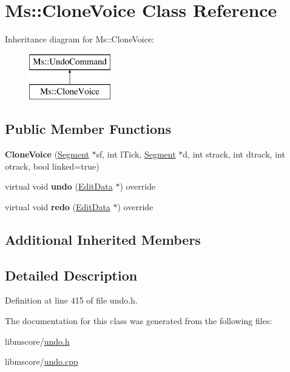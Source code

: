 \hypertarget{class_ms_1_1_clone_voice}{}\section{Ms\+:\+:Clone\+Voice Class Reference}
\label{class_ms_1_1_clone_voice}
Inheritance diagram for Ms\+:\+:Clone\+Voice\+:\begin{figure}[H]
\begin{center}
\leavevmode
\includegraphics[height=2.000000cm]{class_ms_1_1_clone_voice}
\end{center}
\end{figure}
\subsection*{Public Member Functions}
\begin{DoxyCompactItemize}
\item 
\mbox{\label{class_ms_1_1_clone_voice_aeb74663661780ec4a9a17130eada245b}} 
{\bfseries Clone\+Voice} (\hyperlink{class_ms_1_1_segment}{Segment} $\ast$sf, int l\+Tick, \hyperlink{class_ms_1_1_segment}{Segment} $\ast$d, int strack, int dtrack, int otrack, bool linked=true)
\item 
\mbox{\label{class_ms_1_1_clone_voice_a1f987d0f303c266b5f1fcebde0d21af3}} 
virtual void {\bfseries undo} (\hyperlink{class_ms_1_1_edit_data}{Edit\+Data} $\ast$) override
\item 
\mbox{\label{class_ms_1_1_clone_voice_a1fd9ff246f07a434f9b2f143a74d345c}} 
virtual void {\bfseries redo} (\hyperlink{class_ms_1_1_edit_data}{Edit\+Data} $\ast$) override
\end{DoxyCompactItemize}
\subsection*{Additional Inherited Members}


\subsection{Detailed Description}


Definition at line 415 of file undo.\+h.



The documentation for this class was generated from the following files\+:\begin{DoxyCompactItemize}
\item 
libmscore/\hyperlink{undo_8h}{undo.\+h}\item 
libmscore/\hyperlink{undo_8cpp}{undo.\+cpp}\end{DoxyCompactItemize}
